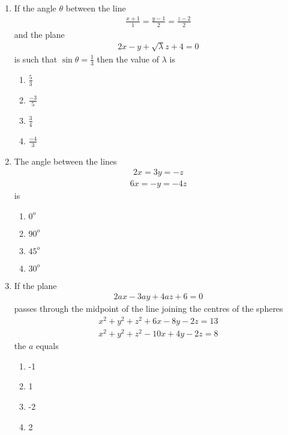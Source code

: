 \begin{enumerate}[label=\arabic*.,ref=\thesubsection.\theenumi]
\item If the angle $\theta$ between the line 
\begin{align*}
\frac{x + 1}{1} = \frac{y - 1}{2} = \frac{z - 2}{2}
\end{align*}
and the plane 
\begin{align*}
2x - y + \sqrt{\lambda}z + 4 = 0
\end{align*}
 is such that $\sin\theta = \frac{1}{3}$ then the value of $\lambda$ is
\begin{enumerate}
\item $\frac{5}{3}$
\item $\frac{-3}{5}$
\item $\frac{3}{4}$
\item $\frac{-4}{3}$
\end{enumerate}

\item The angle between the lines
\begin{align*}
2x = 3y = -z
\end{align*}
\begin{align*}
6x = -y = -4z
\end{align*}
is
\begin{enumerate}
\item $0^{o}$
\item $90^{o}$
\item $45^{o}$
\item $30^{o}$
\end{enumerate}

\item If the plane
\begin{align*}
2ax - 3ay + 4az + 6 = 0
\end{align*}
passes through the midpoint of the line joining the centres of the spheres
\begin{align}
x^2 + y^2 + z^2 + 6x - 8y - 2z = 13
\end{align}
\begin{align}
x^2 + y^2 + z^2 - 10x + 4y - 2z = 8
\end{align}
the $a$ equals
\begin{enumerate}
\item -1
\item 1
\item -2
\item 2
\end{enumerate}


\end{enumerate}
